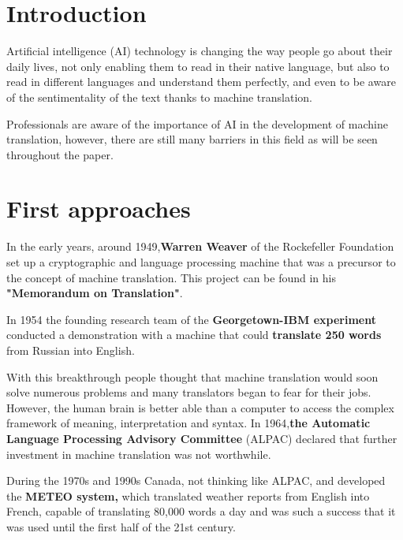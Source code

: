 \documentclass[a4paper]{article}
\theoremstyle{plain}
\theoremstyle{definition}
\begin{document}
	\newpage
	
	\tableofcontents
	\newpage
	\section{Introduction}
	\label{sec:intro}
	Artificial intelligence (AI) technology is changing the way people go about their daily lives, not only enabling them to read in their native language, but also to read in different languages and understand them perfectly, and even to be aware of the sentimentality of the text thanks to machine translation.\newline

    Professionals are aware of the importance of AI in the development of machine translation, however, there are still many barriers in this field as will be seen throughout the paper.


	
	
    
	
	


	
	
	\section{First approaches}
	\label{sec:examples}
    In the early years, around 1949,\textbf{Warren Weaver}  of the Rockefeller Foundation set up a cryptographic and language processing machine that was a precursor to the concept of machine translation. This project can be found in his \textbf{"Memorandum on Translation"}.\newline
    
    In 1954 the founding research team of the \textbf{Georgetown-IBM experiment} conducted a demonstration with a machine that could \textbf{translate 250 words} from Russian into English.\newline
    
    With this breakthrough people thought that machine translation would soon solve numerous problems and many translators began to fear for their jobs. However, the human brain is better able than a computer to access the complex framework of meaning, interpretation and syntax. In 1964,\textbf{the Automatic Language Processing Advisory Committee}  (ALPAC) declared that further investment in machine translation was not worthwhile.\newline
    
    During the 1970s and 1990s Canada, not thinking like ALPAC, and developed the \textbf{METEO system,} which translated weather reports from English into French, capable of translating 80,000 words a day and was such a success that it was used until the first half of the 21st century.\newline
    
\end{document}
